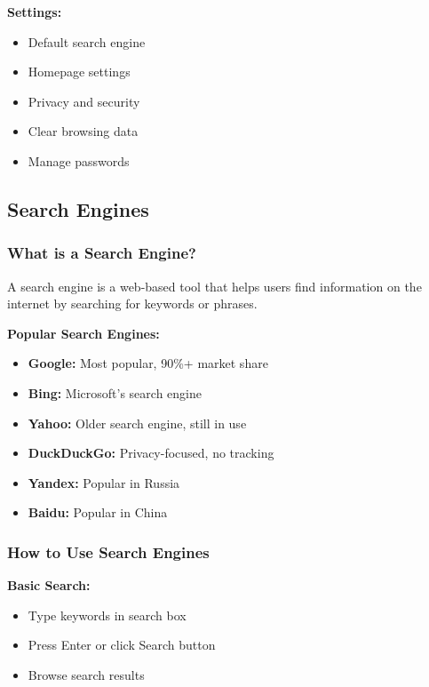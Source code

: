 \documentclass[12pt,a4paper]{article}
\begin{document}
\textbf{Settings:}
\begin{itemize}
    \item Default search engine
    \item Homepage settings
    \item Privacy and security
    \item Clear browsing data
    \item Manage passwords
\end{itemize}

\subsection{Search Engines}

\subsubsection{What is a Search Engine?}
A search engine is a web-based tool that helps users find information on the internet by searching for keywords or phrases.

\textbf{Popular Search Engines:}
\begin{itemize}
    \item \textbf{Google:} Most popular, 90\%+ market share
    \item \textbf{Bing:} Microsoft's search engine
    \item \textbf{Yahoo:} Older search engine, still in use
    \item \textbf{DuckDuckGo:} Privacy-focused, no tracking
    \item \textbf{Yandex:} Popular in Russia
    \item \textbf{Baidu:} Popular in China
\end{itemize}

\subsubsection{How to Use Search Engines}

\textbf{Basic Search:}
\begin{itemize}
    \item Type keywords in search box
    \item Press Enter or click Search button
    \item Browse search results
\end{itemize}
\end{document}
